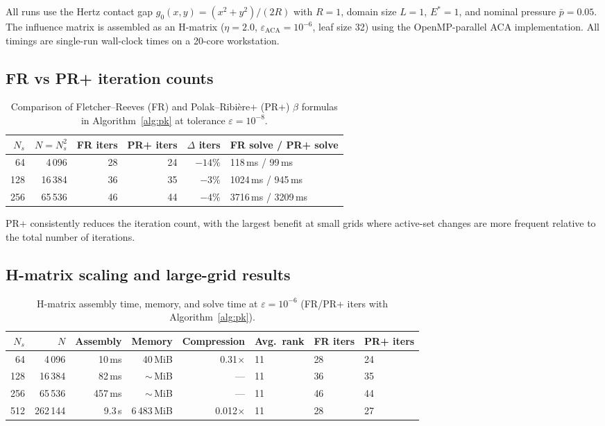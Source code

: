 \documentclass[11pt,a4paper]{article}
\begin{document}
All runs use the Hertz contact gap
$g_0(x,y) = (x^2 + y^2)/(2R)$ with $R = 1$, domain size $L = 1$,
$E^* = 1$, and nominal pressure $\bar p = 0.05$.
The influence matrix is assembled as an H-matrix
($\eta = 2.0$, $\varepsilon_{\mathrm{ACA}} = 10^{-6}$, leaf size 32)
using the OpenMP-parallel ACA implementation.
All timings are single-run wall-clock times on a 20-core workstation.

\subsection{FR vs PR+ iteration counts}

\begin{table}[ht]
\centering
\caption{Comparison of Fletcher--Reeves (FR) and Polak--Ribi\`ere+ (PR+)
         $\beta$ formulas in Algorithm~\ref{alg:pk} at tolerance $\varepsilon = 10^{-8}$.}
\label{tab:iter}
\begin{tabular}{@{}rrrrrl@{}}
\toprule
$N_s$ & $N = N_s^2$ & FR iters & PR+ iters & $\Delta$ iters & FR solve / PR+ solve \\
\midrule
 64  &     4\,096 & 28 & 24 & $-14\%$ & 118\,ms / 99\,ms \\
128  &    16\,384 & 36 & 35 & $-3\%$  & 1024\,ms / 945\,ms \\
256  &    65\,536 & 46 & 44 & $-4\%$  & 3716\,ms / 3209\,ms \\
\bottomrule
\end{tabular}
\end{table}

PR+ consistently reduces the iteration count, with the largest benefit at
small grids where active-set changes are more frequent relative to the
total number of iterations.

\subsection{H-matrix scaling and large-grid results}

\begin{table}[ht]
\centering
\caption{H-matrix assembly time, memory, and solve time at $\varepsilon = 10^{-6}$
         (FR/PR+ iters with Algorithm~\ref{alg:pk}).}
\label{tab:scaling}
\begin{tabular}{@{}rrrrrlll@{}}
\toprule
$N_s$ & $N$ & Assembly & Memory & Compression & Avg.\ rank & FR iters & PR+ iters \\
\midrule
  64 &      4\,096 &    10\,ms &      40\,MiB & 0.31$\times$ & 11 & 28 & 24 \\
 128 &     16\,384 &    82\,ms &     $\sim$\!200\,MiB & --- & 11 & 36 & 35 \\
 256 &     65\,536 &   457\,ms &   $\sim$\!800\,MiB & --- & 11 & 46 & 44 \\
 512 &   262\,144 &   9.3\,s  &   6\,483\,MiB & 0.012$\times$ & 11 & 28 & 27 \\
\bottomrule
\end{tabular}
\end{table}
\end{document}
